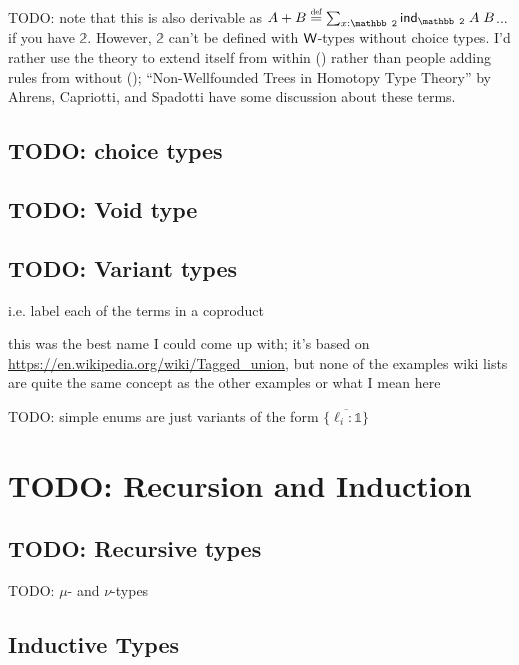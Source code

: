 \documentclass[11pt]{article} %
\theoremstyle{definition}
\theoremstyle{remark}
\begin{document}
TODO: note that this is also derivable as $A + B \defeq \sum_{x:\mathbb 2}\ind_\mathbb 2\;A\;B$... if you have $\mathbb 2$.
However, $\mathbb 2$ can't be defined with $\mathsf{W}$-types without choice types.
I'd rather use the theory to extend itself from within () rather than people adding rules from without (); ``Non-Wellfounded Trees in Homotopy Type Theory'' by Ahrens, Capriotti, and Spadotti have some discussion about these terms.

\subsection{TODO: \Nary{} choice types}

\subsection{TODO: Void type}
\label{subsec:void-type}

\subsection{TODO: Variant types}

i.e. label each of the terms in a coproduct

this was the best name I could come up with; it's based on \url{https://en.wikipedia.org/wiki/Tagged_union}, but none of the examples wiki lists are quite the same concept as the other examples or what I mean here


TODO: simple enums are just variants of the form $\{\overline{\ell_i\colon \mathbb 1}\}$



\section{TODO: Recursion and Induction}
\label{sec:ind-types}
\subsection{TODO: Recursive types}
TODO: $\mu$- and $\nu$-types

\subsection{Inductive Types}
\end{document}
